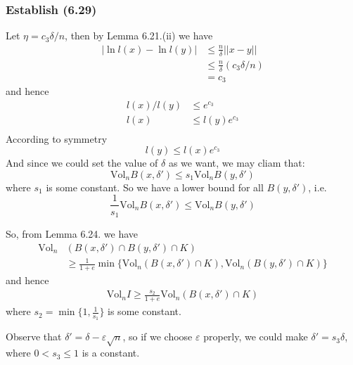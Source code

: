 \documentclass{article}
\begin{document}
\subsubsection{Establish (6.29)}
Let $\eta = c_3\delta/n$, then by Lemma 6.21.(ii) we have
\begin{align*}
  |\ln l(x) - \ln l(y)| &\leq \frac{n}{\delta} || x - y || \\
  &\leq \frac{n}{\delta} (c_3\delta/n)\\
  &= c_3
\end{align*}
and hence
\begin{align*}
  l(x)/l(y) &\leq e^{c_3} \\
  l(x) &\leq l(y)e^{c_3} \\
\end{align*}
According to symmetry
\[l(y) \leq l(x)e^{c_3}\]
And since we could set the value of $\delta$ as we want, we may cliam that:
\[\mathrm{Vol}_nB(x,\delta') \leq s_1\mathrm{Vol}_nB(y,\delta')\]
where $s_1$ is some constant.
So we have a lower bound for all $B(y,\delta')$, i.e.
\[\frac{1}{s_1}\mathrm{Vol}_nB(x,\delta') \leq \mathrm{Vol}_nB(y,\delta')\]

So, from Lemma 6.24. we have
\begin{align*}
  \mathrm{Vol}_n&(B(x,\delta') \cap B(y, \delta') \cap K) \\
  &\geq \frac{1}{1 + e}\min\{\mathrm{Vol}_n(B(x, \delta')\cap K), \mathrm{Vol}_n(B(y,\delta')\cap K)\}
\end{align*}
and hence
\begin{align*}
  \mathrm{Vol}_n I \geq \frac{s_2}{1+e} \mathrm{Vol}_n (B(x,\delta')\cap K)
\end{align*}
where $s_2 = \min\{1, \frac{1}{s_1}\}$ is some constant.

Observe that $\delta' = \delta - \varepsilon\sqrt{n}$, so if we choose $\varepsilon$ properly,
we could make $\delta' = s_3 \delta$,
where $0 < s_3 \leq 1$ is a constant.
\end{document}
